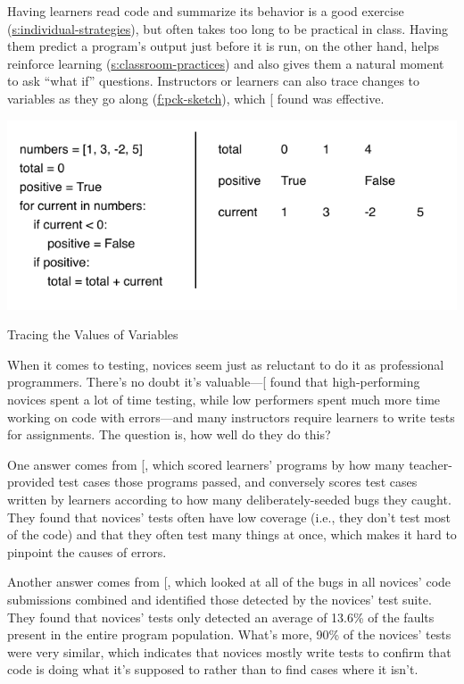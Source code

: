 Having learners read code and summarize its behavior is a good exercise
(\protect\hyperlink{SECTION}{s:individual-strategies}), but often takes too long to be
practical in class. Having them predict a program's output just before
it is run, on the other hand, helps reinforce learning
(\protect\hyperlink{SECTION}{s:classroom-practices}) and also gives them a natural
moment to ask ``what if'' questions. Instructors or learners can also
trace changes to variables as they go along (\protect\hyperlink{FIGURE}{f:pck-sketch}),
which {[}\protect[\hyperlink{b:Cunn2017}{Cunn2017}]{]} found was effective.

\includegraphics{../../files/sketching-variables.pdf}

Tracing the Values of Variables

When it comes to testing, novices seem just as reluctant to do it as
professional programmers. There's no doubt it's
valuable---{[}\protect[\hyperlink{b:Cart2017}{Cart2017}]{]} found that high-performing novices spent a
lot of time testing, while low performers spent much more time working
on code with errors---and many instructors require learners to write tests
for assignments. The question is, how well do they do this?

One answer comes from {[}\protect[\hyperlink{b:Bria2015}{Bria2015}]{]}, which scored learners'
programs by how many teacher-provided test cases those programs passed,
and conversely scores test cases written by learners according to how
many deliberately-seeded bugs they caught. They found that novices'
tests often have low coverage (i.e., they don't test most of the code)
and that they often test many things at once, which makes it hard to
pinpoint the causes of errors.

Another answer comes from {[}\protect[\hyperlink{b:Edwa2014b}{Edwa2014b}]{]}, which looked at all of
the bugs in all novices' code submissions combined and identified those
detected by the novices' test suite. They found that novices' tests only
detected an average of 13.6\% of the faults present in the entire program
population. What's more, 90\% of the novices' tests were very similar,
which indicates that novices mostly write tests to confirm that code is
doing what it's supposed to rather than to find cases where it isn't.


